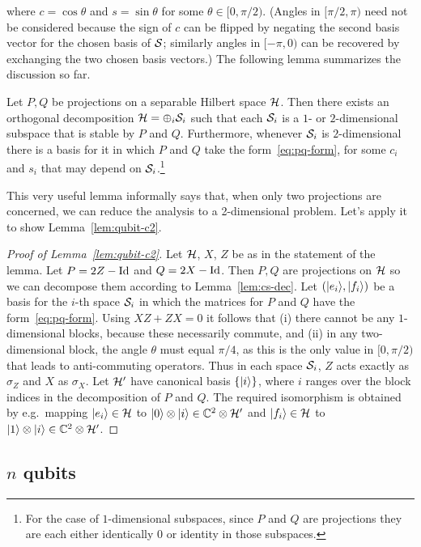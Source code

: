 where $c = \cos\theta$ and $s=\sin\theta$ for some $\theta \in [0,\pi/2)$. (Angles in $[\pi/2,\pi)$ need not be considered because the sign of $c$ can be flipped by negating the second basis vector for the chosen basis of $\mathcal{S}$; similarly angles in $[-\pi,0)$ can be recovered by exchanging the two chosen basis vectors.) The following lemma summarizes the discussion so far. 

\begin{lemma}\label{lem:cs-dec}
Let $P,Q$ be projections on a separable Hilbert space $\mathcal{H}$. Then there exists an orthogonal decomposition $\mathcal{H} = \oplus_i \mathcal{S}_i$ such that each $\mathcal{S}_i$ is a $1$- or $2$-dimensional subspace that is stable by $P$ and $Q$. Furthermore, whenever $\mathcal{S}_i$ is $2$-dimensional there is a basis for it in which $P$ and $Q$ take the form~\eqref{eq:pq-form}, for some $c_i$ and $s_i$ that may depend on $\mathcal{S}_i$.\footnote{For the case of $1$-dimensional subspaces, since $P$ and $Q$ are projections they are each either identically $0$ or identity in those subspaces.}
\end{lemma} 

This very useful lemma informally says that, when only two projections are concerned, we can reduce the analysis to a 2-dimensional problem. Let's apply it to show Lemma~\ref{lem:qubit-c2}. 


\begin{proof}[Proof of Lemma~\ref{lem:qubit-c2}]
Let $\mathcal{H}$, $X$, $Z$ be as in the statement of the lemma. Let $P=2Z-\mathop{\rm Id}\nolimits$ and $Q = 2X-\mathop{\rm Id}\nolimits$. Then $P,Q$ are projections on $\mathcal{H}$ so we can decompose them according to Lemma~\ref{lem:cs-dec}. Let $(|e_i\rangle,|f_i\rangle)$ be a basis for the $i$-th space $\mathcal{S}_i$ in which the matrices for $P$ and $Q$ have the form~\eqref{eq:pq-form}. Using $XZ+ZX=0$ it follows that (i) there cannot be any $1$-dimensional blocks, because these necessarily commute, and (ii) in any two-dimensional block, the angle $\theta$ must equal $\pi/4$, as this is the only value in $[0,\pi/2)$ that leads to anti-commuting operators. Thus in each space $\mathcal{S}_i$, $Z$ acts exactly as $\sigma_Z$ and $X$ as $\sigma_X$. Let $\mathcal{H}'$ have canonical basis $\{|i\rangle\}$, where $i$ ranges over the block indices in the decomposition of $P$ and $Q$. The required isomorphism is obtained by e.g.\ mapping $|e_i\rangle\in \mathcal{H}$ to $|0\rangle \otimes |i\rangle\in \mathbb{C}^2 \otimes \mathcal{H}'$ and $|f_i\rangle\in\mathcal{H}$ to $|1\rangle\otimes |i\rangle\in\mathbb{C}^2\otimes\mathcal{H}'$. 
\end{proof}


\subsection{$n$ qubits}


